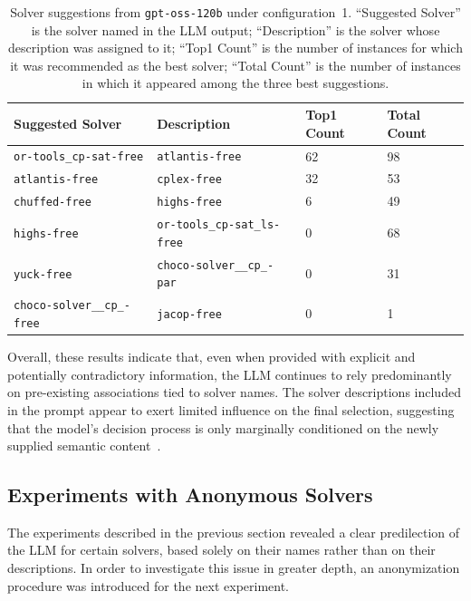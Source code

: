 \documentclass[../../main]{subfiles}
\begin{document}
\begin{table}[ht]
    \centering
        \begin{tabular}{llll}
        \hline
            Suggested Solver & Description & Top1 Count & Total Count \\ \hline
            \texttt{or-tools\_cp-sat-free} & \texttt{atlantis-free} & 62 & 98 \\ 
            \texttt{atlantis-free} & \texttt{cplex-free} & 32 & 53 \\ 
            \texttt{chuffed-free} & \texttt{highs-free} & 6 & 49 \\ 
            \texttt{highs-free} & \texttt{or-tools\_cp-sat\_ls-free} & 0 & 68 \\ 
            \texttt{yuck-free} & \texttt{choco-solver\_\_cp\_-par} & 0 & 31 \\ 
            \texttt{choco-solver\_\_cp\_-free} & \texttt{jacop-free} & 0 & 1 \\ \hline
        \end{tabular}
    \caption{Solver suggestions from \texttt{gpt-oss-120b} under configuration~1. ``Suggested Solver'' is the solver named in the LLM output; ``Description'' is the solver whose description was assigned to it; ``Top1 Count'' is the number of instances for which it was recommended as the best solver; ``Total Count'' is the number of instances in which it appeared among the three best suggestions.}
    \label{tab:swappedCount1}
\end{table}

Overall, these results indicate that, even when provided with explicit and potentially contradictory information, the LLM continues to rely predominantly on pre-existing associations tied to solver names. The solver descriptions included in the prompt appear to exert limited influence on the final selection, suggesting that the model's decision process is only marginally conditioned on the newly supplied semantic content~\cite{MemorizationVSReasoning}.

\subsection{Experiments with Anonymous Solvers}
The experiments described in the previous section revealed a clear predilection of the LLM for certain solvers, based solely on their names rather than on their descriptions. In order to investigate this issue in greater depth, an anonymization procedure was introduced for the next experiment.
\end{document}
